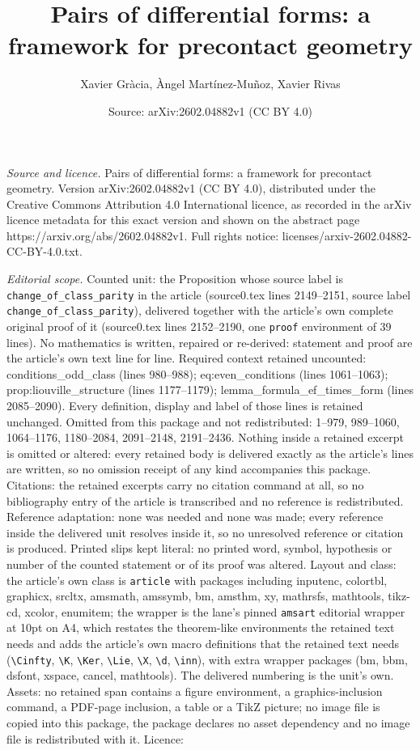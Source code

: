 \documentclass[10pt,a4paper]{amsart}
\title[Pairs of differential forms: a framework for precontact geom]{Pairs of differential forms: a framework for precontact geometry}
\author{Xavier Gr\`acia, \`Angel Mart\'inez-Mu\~noz, Xavier Rivas}
\date{Source: arXiv:2602.04882v1 (CC BY 4.0)}
\begin{document}
\maketitle

\noindent\emph{Source and licence.} Pairs of differential forms: a framework for precontact geometry. Version arXiv:2602.04882v1 (CC BY 4.0), distributed under the Creative Commons Attribution 4.0 International licence, as recorded in the arXiv licence metadata for this exact version and shown on the abstract page https://arxiv.org/abs/2602.04882v1. Full rights notice: licenses/arxiv-2602.04882-CC-BY-4.0.txt.\par\smallskip

\noindent\textit{Editorial scope.} Counted unit: the Proposition whose source label is \texttt{change\_of\_class\_parity} in the article (source0.tex lines 2149--2151, source label \texttt{change\_of\_class\_parity}), delivered together with the article's own complete original proof of it (source0.tex lines 2152--2190, one \texttt{proof} environment of 39 lines). No mathematics is written, repaired or re-derived: statement and proof are the article's own text line for line. Required context retained uncounted: conditions\_odd\_class (lines 980--988); eq:even\_conditions (lines 1061--1063); prop:liouville\_structure (lines 1177--1179); lemma\_formula\_ef\_times\_form (lines 2085--2090). Every definition, display and label of those lines is retained unchanged. Omitted from this package and not redistributed: 1--979, 989--1060, 1064--1176, 1180--2084, 2091--2148, 2191--2436. Nothing inside a retained excerpt is omitted or altered: every retained body is delivered exactly as the article's lines are written, so no omission receipt of any kind accompanies this package. Citations: the retained excerpts carry no citation command at all, so no bibliography entry of the article is transcribed and no reference is redistributed. Reference adaptation: none was needed and none was made; every reference inside the delivered unit resolves inside it, so no unresolved reference or citation is produced. Printed slips kept literal: no printed word, symbol, hypothesis or number of the counted statement or of its proof was altered. Layout and class: the article's own class is \texttt{article} with packages including inputenc, colortbl, graphicx, srcltx, amsmath, amssymb, bm, amsthm, xy, mathrsfs, mathtools, tikz-cd, xcolor, enumitem; the wrapper is the lane's pinned \texttt{amsart} editorial wrapper at 10pt on A4, which restates the theorem-like environments the retained text needs and adds the article's own macro definitions that the retained text needs (\texttt{\textbackslash Cinfty}, \texttt{\textbackslash K}, \texttt{\textbackslash Ker}, \texttt{\textbackslash Lie}, \texttt{\textbackslash X}, \texttt{\textbackslash d}, \texttt{\textbackslash inn}), with extra wrapper packages (bm, bbm, dsfont, xspace, cancel, mathtools). The delivered numbering is the unit's own. Assets: no retained span contains a figure environment, a graphics-inclusion command, a PDF-page inclusion, a table or a TikZ picture; no image file is copied into this package, the package declares no asset dependency and no image file is redistributed with it. Licence: 
\end{document}
